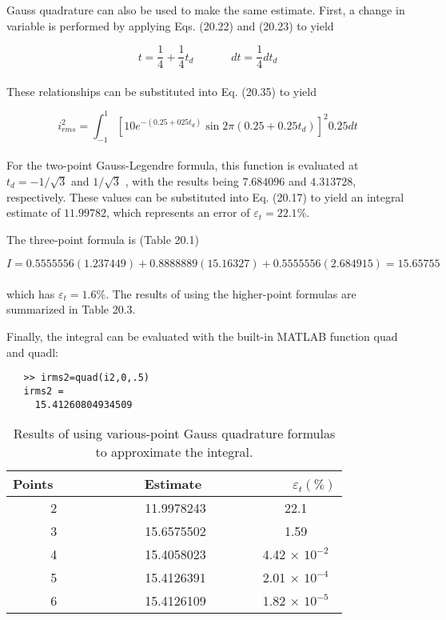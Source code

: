 Gauss quadrature can also be used to make the same estimate. First, a change in
variable is performed by applying Eqs. (20.22) and (20.23) to yield

	$$t= \dfrac{1}{4} + \dfrac{1}{4}t_{d} \; \; \; \; \; \; \; \; \; \; \; \; dt=\dfrac{1}{4} dt_{d} $$\\
These relationships can be substituted into Eq. (20.35) to yield

\begin{equation}
	\tag{20.36}
	i^{2}_{rms} = \int^{1}_{-1} [10e^{-(0.25+025t_{d})} \sin 2\pi (0.25+0.25t_{d})]^{2} 0.25 dt
\end{equation}\\
For the two-point Gauss-Legendre formula, this function is evaluated at $t_{d} = −1/\sqrt{3}$ and $1/\sqrt{3}$ , with the results being $7.684096$ and $4.313728$, respectively. These values can be
substituted into Eq. (20.17) to yield an integral estimate of $11.99782$, which represents an
error of $\varepsilon_{t} = 22.1\%$.

The three-point formula is (Table 20.1)

$$I = 0.5555556(1.237449) + 0.8888889(15.16327) + 0.5555556(2.684915) = 15.65755$$\\
which has $\varepsilon_{t} = 1.6\%$. The results of using the higher-point formulas are summarized in
Table 20.3.

Finally, the integral can be evaluated with the built-in MATLAB function quad and quadl:
\begin{verbatim}
   >> irms2=quad(i2,0,.5)
   irms2 =
     15.41260804934509
\end{verbatim}

\begin{table}[hbt!]
\caption{\textsf{Results of using various-point Gauss quadrature
formulas to approximate the integral.  }}
\centering
\begin{tabular}{ccc}
	\hline
	\textbf{Points} \ \ \ \ \ & \ \ \ \ \ \textbf{Estimate} \ \ \ \ \  & \ \ \ \ \  \textbf{$\varepsilon_{t} (\%)$}\\ \hline
	
	2 & 11.9978243 & 22.1\\

	3 & 15.6575502 & 1.59\\

	4 & 15.4058023 & 4.42 × $10^{-2}$\\
	
	5 & 15.4126391 & 2.01 × $10^{-4}$\\
	
	6 & 15.4126109 & 1.82 × $10^{-5}$\\ \hline
\end{tabular}
\end{table}

